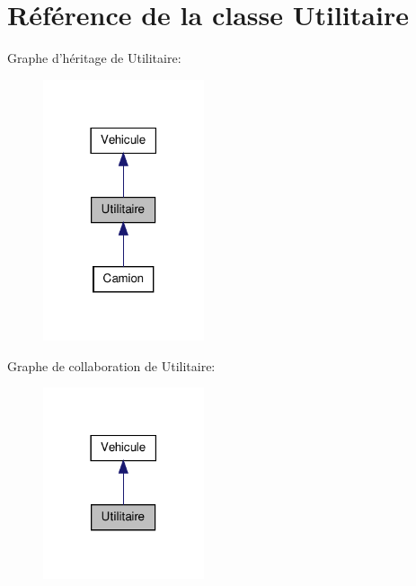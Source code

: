 \hypertarget{class_utilitaire}{
\section{Référence de la classe Utilitaire}
\label{class_utilitaire}
}


Graphe d'héritage de Utilitaire:
\nopagebreak
\begin{figure}[H]
\begin{center}
\leavevmode
\includegraphics[width=134pt]{class_utilitaire__inherit__graph}
\end{center}
\end{figure}


Graphe de collaboration de Utilitaire:
\nopagebreak
\begin{figure}[H]
\begin{center}
\leavevmode
\includegraphics[width=134pt]{class_utilitaire__coll__graph}
\end{center}
\end{figure}
